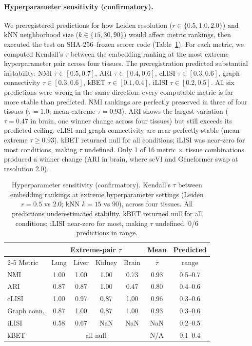 \documentclass[10pt,letterpaper]{article}
\begin{document}
\paragraph{Hyperparameter sensitivity (confirmatory).} We preregistered predictions for how Leiden resolution ($r \in \{0.5, 1.0, 2.0\}$) and kNN neighborhood size ($k \in \{15, 30, 90\}$) would affect metric rankings, then executed the test on SHA-256--frozen scorer code (Table~\ref{tab:hyperparam}). For each metric, we computed Kendall's $\tau$ between the embedding ranking at the most extreme hyperparameter pair across four tissues. The preregistration predicted substantial instability: NMI $\tau \in [0.5, 0.7]$, ARI $\tau \in [0.4, 0.6]$, cLISI $\tau \in [0.3, 0.6]$, graph connectivity $\tau \in [0.3, 0.6]$, kBET $\tau \in [0.1, 0.4]$, iLISI $\tau \in [0.2, 0.5]$. All six predictions were wrong in the same direction: every computable metric is far more stable than predicted. NMI rankings are perfectly preserved in three of four tissues ($\tau = 1.0$; mean extreme $\tau = 0.93$). ARI shows the largest variation ($\tau = 0.47$ in brain, one winner change across four tissues) but still exceeds its predicted ceiling. cLISI and graph connectivity are near-perfectly stable (mean extreme $\tau \geq 0.93$). kBET returned null for all conditions; iLISI was near-zero for most conditions, making $\tau$ undefined. Only 1 of 16 metric $\times$ tissue combinations produced a winner change (ARI in brain, where scVI and Geneformer swap at resolution 2.0).

\begin{table}[t]
\centering
\caption{Hyperparameter sensitivity (confirmatory). Kendall's $\tau$ between embedding rankings at extreme hyperparameter settings (Leiden $r = 0.5$ vs $2.0$; kNN $k = 15$ vs $90$), across four tissues. All predictions underestimated stability. kBET returned null for all conditions; iLISI near-zero for most, making $\tau$ undefined. 0/6 predictions in range.}
\label{tab:hyperparam}
\small
\begin{tabular}{@{}lcccccc@{}}
\toprule
 & \multicolumn{4}{c}{Extreme-pair $\tau$} & Mean & Predicted \\
\cmidrule(lr){2-5}
Metric & Lung & Liver & Kidney & Brain & $\bar{\tau}$ & range \\
\midrule
NMI & 1.00 & 1.00 & 1.00 & 0.73 & 0.93 & 0.5--0.7 \\
ARI & 0.87 & 0.87 & 1.00 & 0.47 & 0.80 & 0.4--0.6 \\
cLISI & 1.00 & 0.97 & 0.87 & 1.00 & 0.96 & 0.3--0.6 \\
Graph conn. & 0.87 & 1.00 & 0.87 & 1.00 & 0.93 & 0.3--0.6 \\
iLISI & 0.58 & 0.67 & NaN & NaN & NaN & 0.2--0.5 \\
kBET & \multicolumn{4}{c}{all null} & N/A & 0.1--0.4 \\
\bottomrule
\end{tabular}
\end{table}
\end{document}

